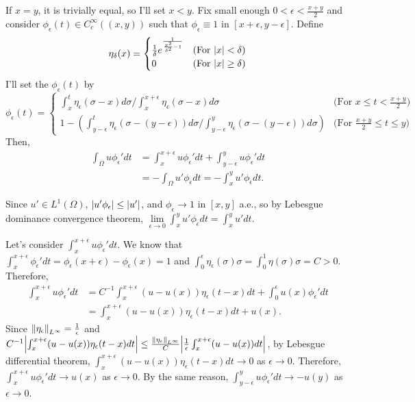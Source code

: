 \documentclass{article}
\begin{document}
If $x=y$, it is trivially equal, so I'll set $x<y$. Fix small enough $0<\epsilon<\frac{x+y}{2}$ and consider $\phi_\epsilon(t)\in C_c^\infty((x, y))$ such that $\phi_\epsilon\equiv 1$ in $[x+\epsilon, y-\epsilon]$. Define 
\begin{equation*}
\eta_\delta(x)=
\begin{cases}
\frac{1}{\delta}e^{\frac{1}{\frac{x^2}{\delta^2}-1}} & \text{(For }\abs{x}<\delta\text{)} \\
0 & \text{(For }\abs{x}\geq\delta\text{)}
\end{cases}
\end{equation*}
I'll set the $\phi_\epsilon(t)$ by
\begin{equation*}
\phi_\epsilon(t)=
\begin{cases}
\int_x^t \eta_\epsilon(\sigma-x)d\sigma/\int_x^{x+\epsilon} \eta_\epsilon(\sigma-x)d\sigma & \text{(For }x\leq t<\frac{x+y}{2}\text{)} \\
1-\left(\int_{y-\epsilon}^t \eta_\epsilon(\sigma-(y-\epsilon))d\sigma/\int_{y-\epsilon}^y \eta_\epsilon(\sigma-(y-\epsilon))d\sigma\right) & \text{(For }\frac{x+y}{2}\leq t\leq y\text{)}
\end{cases}
\end{equation*}
Then,
\begin{equation*}
\begin{split}
\int_\Omega u\phi_\epsilon'dt&=\int_{x}^{x+\epsilon} u \phi_\epsilon' dt + \int_{y-\epsilon}^{y} u \phi_\epsilon' dt \\
&=-\int_\Omega u'\phi_\epsilon dt=-\int_{x}^{y} u'\phi_\epsilon dt.
\end{split}
\end{equation*}

Since $u'\in L^1(\Omega)$, $\abs{u'\phi_\epsilon}\leq \abs{u'}$, and $\phi_\epsilon\rightarrow 1$ in $[x,y]$ a.e., so by Lebesgue dominance convergence theorem, $\lim\limits_{\epsilon\rightarrow 0} \int_x^y u'\phi_\epsilon dt=\int_x^y u' dt$.

Let's consider $\int_x^{x+\epsilon} u\phi_\epsilon' dt$. We know that $\int_x^{x+\epsilon} \phi_\epsilon' dt=\phi_\epsilon(x+\epsilon)-\phi_\epsilon(x)=1$ and $\int_0^\epsilon \eta_\epsilon(\sigma)\sigma=\int_0^1 \eta(\sigma)\sigma=C>0$. Therefore,
\begin{equation*}
\begin{split}
\int_x^{x+\epsilon} u\phi_\epsilon' dt&=C^{-1}\int_x^{x+\epsilon} (u - u(x)) \eta_\epsilon(t-x) dt + \int_0^\epsilon u(x)\phi_\epsilon' dt \\
&=\int_x^{x+\epsilon} (u - u(x)) \eta_\epsilon(t-x) dt+u(x).
\end{split}
\end{equation*}
Since $\norm{\eta_\epsilon}_{L^\infty}=\frac{1}{\epsilon}$ and $C^{-1}\abs{\int_x^{x+\epsilon} (u - u(x)) \eta_\epsilon(t-x) dt} \leq \frac{\norm{\eta_\epsilon}_{L^\infty}}{C}\abs{\frac{1}{\epsilon}\int_x^{x+\epsilon} (u - u(x)) dt}$, by Lebesgue differential theorem, $\int_x^{x+\epsilon} (u - u(x)) \eta_\epsilon(t-x) dt\rightarrow 0$ as $\epsilon\rightarrow 0$. 
Therefore, $\int_x^{x+\epsilon} u\phi_\epsilon' dt \rightarrow u(x)$ as $\epsilon\rightarrow 0$. 
By the same reason, $\int_{y-\epsilon}^y u\phi_\epsilon' dt \rightarrow -u(y)$ as $\epsilon\rightarrow 0$.
\end{document}
